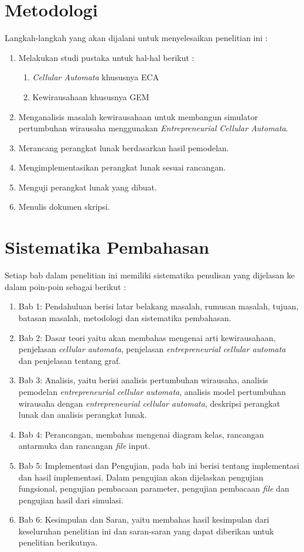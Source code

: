 \section{Metodologi}
\label{sec:metlit}
Langkah-langkah yang akan dijalani untuk menyelesaikan penelitian ini :
\begin{enumerate}
	\item Melakukan studi pustaka untuk hal-hal berikut :
		\begin{enumerate}
			\item \textit{Cellular Automata} khususnya ECA
			\item Kewirausahaan khususnya GEM
		\end{enumerate}
	\item Menganalisis masalah kewirausahaan untuk membangun simulator pertumbuhan wirausaha menggunakan \textit{Entrepreneurial Cellular Automata}.
	\item Merancang perangkat lunak berdasarkan hasil pemodelan.
	\item Mengimplementasikan perangkat lunak sesuai rancangan.
	\item Menguji perangkat lunak yang dibuat.
	\item Menulis dokumen skripsi.
\end{enumerate}


\section{Sistematika Pembahasan}
\label{sec:sispem}
Setiap bab dalam penelitian ini memiliki sistematika penulisan yang dijelasan ke dalam poin-poin sebagai berikut :
\begin{enumerate}
	\item Bab 1: Pendahuluan berisi latar belakang masalah, rumusan masalah, tujuan, batasan masalah, metodologi dan sistematika pembahasan.
	\item Bab 2: Dasar teori yaitu akan membahas mengenai arti kewirausahaan, penjelasan \textit{cellular automata}, penjelasan \textit{entrepreneurial cellular automata} dan penjelasan tentang graf.
	\item Bab 3: Analisis, yaitu berisi analisis pertumbuhan wirausaha, analisis pemodelan \textit{entrepreneurial cellular automata}, analisis model pertumbuhan wirausaha dengan \textit{entrepreneurial cellular automata}, deskripsi perangkat lunak dan analisis perangkat lunak.
	\item Bab 4: Perancangan, membahas mengenai diagram kelas, rancangan antarmuka dan rancangan \textit{file} input.
	\item Bab 5: Implementasi dan Pengujian, pada bab ini berisi tentang implementasi dan hasil implementasi. Dalam pengujian akan dijelaskan pengujian fungsional, pengujian pembacaan parameter, pengujian pembacaan \textit{file} dan pengujian hasil dari simulasi.
	\item Bab 6: Kesimpulan dan Saran, yaitu membahas hasil kesimpulan dari keseluruhan penelitian ini dan saran-saran yang dapat diberikan untuk penelitian berikutnya.
\end{enumerate}



